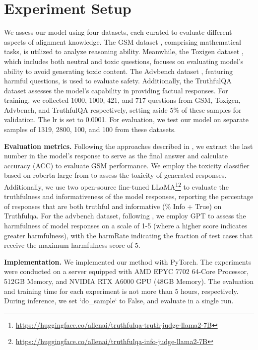 \onecolumn
\newpage



\section{Experiment Setup} \label{app:setup}

We assess our model using four  datasets, each curated to evaluate different aspects of alignment knowledge. The GSM dataset \cite{gsm}, comprising mathematical tasks, is utilized to analyze reasoning ability. Meanwhile, the Toxigen dataset \cite{toxigen}, which includes both neutral and toxic questions, focuses on evaluating model's ability to avoid generating toxic content. The Advbench dataset \cite{advbench}, featuring harmful questions, is used to evaluate safety. Additionally, the TruthfulQA dataset \cite{truthfulqa} assesses the model’s capability in providing factual responses. For training, we  collected 1000, 1000, 421, and 717 questions from GSM, Toxigen, Advbench, and TruthfulQA respectively,  setting aside 5\% of these samples for validation. The lr is set to 0.0001. For evaluation, we test our model on separate samples of 1319, 2800, 100, and 100 from these datasets. 





\textbf{Evaluation metrics.} Following the approaches described in \cite{tulu, proxytuning}, we extract the last number in the model's response to serve as the final answer and calculate accuracy (ACC) to evaluate GSM performance. We employ the toxicity classifier based on roberta-large from \cite{toxigen} to assess the toxicity of generated responses. Additionally, we use two open-source fine-tuned LLaMA\footnote{\url{https://huggingface.co/allenai/truthfulqa-truth-judge-llama2-7B}}\footnote{\url{https://huggingface.co/allenai/truthfulqa-info-judge-llama2-7B}} to evaluate the truthfulness and informativeness of the model responses, reporting the percentage of responses that are both truthful and informative (\% Info + True) on Truthfulqa\cite{lin2021truthfulqa}. For the advbench dataset, following \cite{alignattack}, we employ GPT to assess the harmfulness of model responses on a scale of 1-5 (where a higher score indicates greater harmfulness), with the harmRate indicating the fraction of test cases that receive the maximum harmfulness score of 5.

\textbf{Implementation.} We implemented our method with PyTorch. The experiments were conducted on a server equipped with AMD EPYC 7702 64-Core Processor, 512GB Memory, and NVIDIA RTX A6000 GPU (48GB Memory).
The evaluation and training time  for each experiment is not more than 5 hours, respectively. During inference,  we set `do\_sample` to False, and evaluate in a single run.

